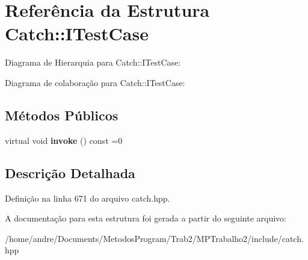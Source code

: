 \hypertarget{structCatch_1_1ITestCase}{}\section{Referência da Estrutura Catch\+:\+:I\+Test\+Case}
\label{structCatch_1_1ITestCase}


Diagrama de Hierarquia para Catch\+:\+:I\+Test\+Case\+:


Diagrama de colaboração para Catch\+:\+:I\+Test\+Case\+:
\subsection*{Métodos Públicos}
\begin{DoxyCompactItemize}
\item 
virtual void {\bfseries invoke} () const =0\hypertarget{structCatch_1_1ITestCase_a678825e62e7c17297621cfeb65588c34}{}\label{structCatch_1_1ITestCase_a678825e62e7c17297621cfeb65588c34}

\end{DoxyCompactItemize}


\subsection{Descrição Detalhada}


Definição na linha 671 do arquivo catch.\+hpp.



A documentação para esta estrutura foi gerada a partir do seguinte arquivo\+:\begin{DoxyCompactItemize}
\item 
/home/andre/\+Documents/\+Metodos\+Program/\+Trab2/\+M\+P\+Trabalho2/include/catch.\+hpp\end{DoxyCompactItemize}
